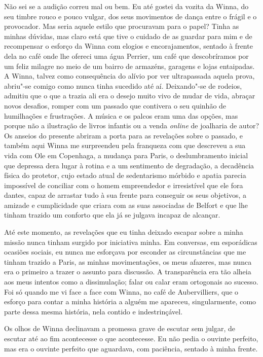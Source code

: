 Não sei se a audição correu mal ou bem. Eu até gostei da vozita da
Winna, do seu timbre rouco e pouco vulgar, dos seus movimentos de dança
entre o frágil e o provocador. Mas seria aquele estilo que procuravam
para o papel? Tinha as minhas dúvidas, mas claro está que tive o cuidado
de as guardar para mim e de recompensar o esforço da Winna com elogios e
encorajamentos, sentado à frente dela no café onde lhe ofereci uma água
Perrier, um café que descobríramos por um feliz milagre no meio de um
bairro de armazéns, garagens e lojas entaipadas. A Winna, talvez como
consequência do alívio por ver ultrapassada aquela prova, abriu"-se
comigo como nunca tinha sucedido até aí. Deixando"-se de rodeios, admitiu
que o que a trazia ali era o desejo muito vivo de mudar de vida,
abraçar novos desafios, romper com um passado que contivera o seu
quinhão de humilhações e frustrações. A música e os palcos eram uma das
opções, mas porque não a ilustração de livros infantis ou a venda
\emph{online }de joalharia de autor? Os anseios do presente abriram a
porta para as revelações sobre o passado, e também aqui Winna me
surpreendeu pela franqueza com que descreveu a sua vida com Ole em
Copenhaga, a mudança para Paris, o deslumbramento inicial que depressa
dera lugar à rotina e a um sentimento de degradação,
a decadência física do protetor, cujo estado atual de
sedentarismo mórbido e apatia parecia impossível de conciliar com o
homem empreendedor e irresistível que ele fora dantes, capaz de arrastar
tudo à sua frente para conseguir os seus objetivos, a amizade e
cumplicidade que criara com as suas associadas de Belfort e que lhe
tinham trazido um conforto que ela já se julgava incapaz de alcançar.

Até este momento, as revelações que eu tinha deixado escapar sobre a
minha missão nunca tinham surgido por iniciativa minha. Em conversas,
em esporádicas ocasiões sociais, eu nunca me esforçava por esconder as
circunstâncias que me tinham trazido a Paris, as minhas movimentações,
os meus afazeres, mas nunca era o primeiro a trazer o assunto para discussão. A transparência era tão alheia aos meus intentos como a
dissimulação; falar ou calar eram ortogonais ao sucesso. Foi só quando
me vi face a face com Winna, no café de Aubervilliers, que o esforço
para contar a minha história a alguém me apareceu, singularmente, como
parte dessa mesma história, nela contido e indestrinçável.

Os olhos de Winna declinavam a promessa grave de escutar sem julgar, de
escutar até ao fim acontecesse o que acontecesse. Eu não pedia o ouvinte
perfeito, mas era o ouvinte perfeito que aguardava, com paciência,
sentado à minha frente.

